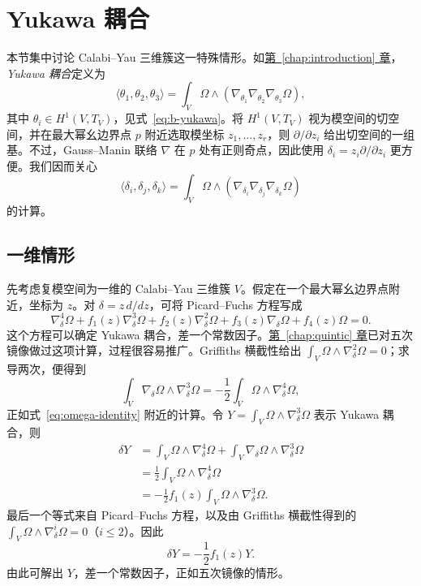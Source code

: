 \section{Yukawa 耦合}\label{sec:yukawa-couplings}

本节集中讨论 Calabi--Yau 三维簇这一特殊情形。如\hyperref[chap:introduction]{第~\ref*{chap:introduction} 章}，\emph{Yukawa 耦合}定义为
\[
\langle\theta_1,\theta_2,\theta_3\rangle
=\int_V\Omega\wedge(\nabla_{\theta_1}\nabla_{\theta_2}\nabla_{\theta_3}\Omega),
\]
其中 $\theta_i\in H^1(V,T_V)$，见式~\eqref{eq:b-yukawa}。将 $H^1(V,T_V)$ 视为模空间的切空间，并在最大幂幺边界点 $p$ 附近选取模坐标 $z_1,\ldots,z_r$，则 $\partial/\partial z_i$ 给出切空间的一组基。不过，Gauss--Manin 联络 $\nabla$ 在 $p$ 处有正则奇点，因此使用 $\delta_i=z_i\partial/\partial z_i$ 更方便。我们因而关心
\[
\langle\delta_i,\delta_j,\delta_k\rangle
=\int_V\Omega\wedge(\nabla_{\delta_i}\nabla_{\delta_j}\nabla_{\delta_k}\Omega)
\]
的计算。

\subsection{一维情形}\label{subsec:yukawa-one-dimensional}

先考虑复模空间为一维的 Calabi--Yau 三维簇 $V$。假定在一个最大幂幺边界点附近，坐标为 $z$。对 $\delta=z\,d/dz$，可将 Picard--Fuchs 方程写成
\[
\nabla_\delta^4\Omega+f_1(z)\nabla_\delta^3\Omega
+f_2(z)\nabla_\delta^2\Omega+f_3(z)\nabla_\delta\Omega+f_4(z)\Omega=0.
\]
这个方程可以确定 Yukawa 耦合，差一个常数因子。\hyperref[chap:quintic]{第~\ref*{chap:quintic} 章}已对五次镜像做过这项计算，过程很容易推广。Griffiths 横截性给出
$\int_V\Omega\wedge\nabla_\delta^2\Omega=0$；求导两次，便得到
\[
\int_V\nabla_\delta\Omega\wedge\nabla_\delta^3\Omega
=-\frac12\int_V\Omega\wedge\nabla_\delta^4\Omega,
\]
正如式~\eqref{eq:omega-identity} 附近的计算。令 $Y=\int_V\Omega\wedge\nabla_\delta^3\Omega$ 表示 Yukawa 耦合，则
\[
\begin{aligned}
\delta Y
&=\int_V\Omega\wedge\nabla_\delta^4\Omega
+\int_V\nabla_\delta\Omega\wedge\nabla_\delta^3\Omega\\
&=\frac12\int_V\Omega\wedge\nabla_\delta^4\Omega\\
&=-\frac12f_1(z)\int_V\Omega\wedge\nabla_\delta^3\Omega.
\end{aligned}
\]
最后一个等式来自 Picard--Fuchs 方程，以及由 Griffiths 横截性得到的
$\int_V\Omega\wedge\nabla_\delta^i\Omega=0$（$i\leq2$）。因此
\[
\delta Y=-\frac12f_1(z)Y.
\]
由此可解出 $Y$，差一个常数因子，正如五次镜像的情形。


